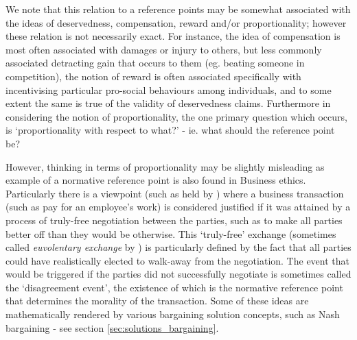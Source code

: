 We note that this relation to a reference points may be somewhat associated with the ideas of deservedness, compensation, reward and/or proportionality; however these relation is not necessarily exact.
For instance, the idea of compensation is most often associated with damages or injury to others, but less commonly associated detracting gain that occurs to them (eg. beating someone in competition), the notion of reward is often associated specifically with incentivising particular pro-social behaviours among individuals, and to some extent the same is true of the validity of deservedness claims.
Furthermore in considering the notion of proportionality, the one primary question which occurs, is `proportionality with respect to what?' - ie. what should the reference point be?

However, thinking in terms of proportionality may be slightly misleading as example of a normative reference point is also found in Business ethics.
Particularly there is a viewpoint (such as held by \cite{ExecutiveCompensationUnjustorJustRight}) where a business transaction (such as pay for an employee's work) is considered justified if it was attained by a process of truly-free negotiation between the parties, such as to make all parties better off than they would be otherwise.
This `truly-free' exchange (sometimes called \textit{euvolentary exchange} by \cite{Guzman2019}) is particularly defined by the fact that all parties could have realistically elected to walk-away from the negotiation.
The event that would be triggered if the parties did not successfully negotiate is sometimes called the `disagreement event', the existence of which is the normative reference point that determines the morality of the transaction.
Some of these ideas are mathematically rendered by various bargaining solution concepts, such as Nash bargaining - see section \ref{sec:solutions_bargaining}.

